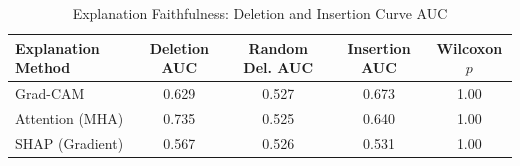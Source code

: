 \begin{table}[t]
\centering
\caption{Explanation Faithfulness: Deletion and Insertion Curve AUC}
\label{tab:faith}
\begin{tabular}{lcccc}
\toprule
\textbf{Explanation Method} & \textbf{Deletion AUC} & \textbf{Random Del. AUC} & \textbf{Insertion AUC} & \textbf{Wilcoxon $p$} \\
\midrule
Grad-CAM          & 0.629 & 0.527 & 0.673 & 1.00 \\
Attention (MHA)   & 0.735 & 0.525 & 0.640 & 1.00 \\
SHAP (Gradient)   & 0.567 & 0.526 & 0.531 & 1.00 \\
\bottomrule
\end{tabular}
\end{table}
